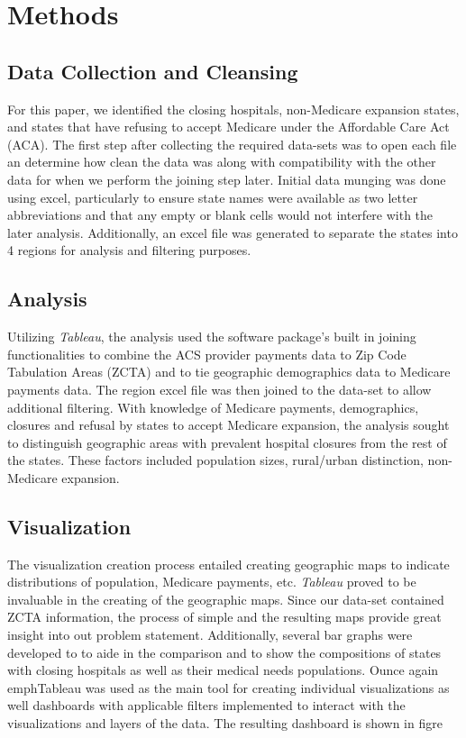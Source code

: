 \documentclass[10pt,conference]{IEEEtran}
\begin{document}
\section{Methods}
\subsection{Data Collection and Cleansing}
For this paper, we identified the closing hospitals, non-Medicare expansion states, and states that have refusing to accept Medicare under the Affordable Care Act (ACA). The first step after collecting the required data-sets was to open each file an determine how clean the data was along with compatibility with the other data for when we perform the joining step later. Initial data munging was done using excel, particularly to ensure state names were available as two letter abbreviations and that any empty or blank cells would not interfere with the later analysis. Additionally, an excel file was generated to separate the states into 4 regions for analysis and filtering purposes. 
\subsection{Analysis}
Utilizing \emph{Tableau}, the analysis used the software package's built in joining functionalities to combine the ACS provider payments data to Zip Code Tabulation Areas (ZCTA) and to tie geographic demographics data to Medicare payments data. The region excel file was then joined to the data-set to allow additional filtering. With knowledge of Medicare payments, demographics, closures and refusal by states to accept Medicare expansion, the analysis sought to distinguish geographic areas with prevalent hospital closures from the rest of the states. These factors included population sizes, rural/urban distinction, non-Medicare expansion. 
\subsection{Visualization}
The visualization creation process entailed creating geographic maps to indicate distributions of population, Medicare payments, etc. \emph{Tableau} proved to be invaluable in the creating of the geographic maps. Since our data-set contained ZCTA information, the process of simple and the resulting maps provide great insight into out problem statement. Additionally, several bar graphs were developed to to aide in the comparison and to show the compositions of states with closing hospitals as well as their medical needs populations. Ounce again emph{Tableau} was used as the main tool for creating individual visualizations as well dashboards with applicable filters implemented to interact with the visualizations and layers of the data. The resulting dashboard is shown in figre 
\end{document}
